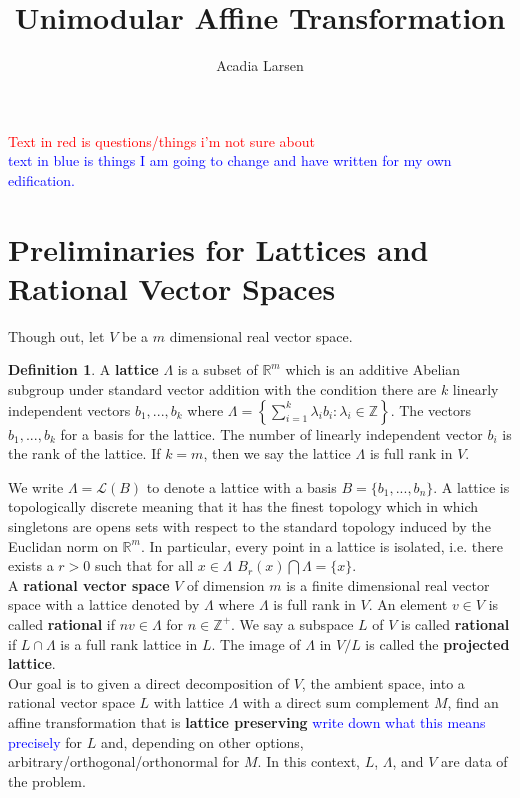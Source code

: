 \documentclass{article}
\title{Unimodular Affine Transformation}
\author{Acadia Larsen}
\newcommand{\nl}{\bigskip \\ } %
\newcommand{\Z}[0]{\mathbb{Z}}		%
\newcommand{\R}[0]{\mathbb{R}}		%
\newcommand{\La}[0]{\mathcal L}
\theoremstyle{definition}
\newtheorem{defn}[thm]{Definition}
\theoremstyle{remark}
\begin{document}
\maketitle
\textcolor{red}{Text in red is questions/things i'm not sure about}\nl 
\textcolor{blue}{text in blue is things I am going to change and have written for my own edification.}
\section{Preliminaries for Lattices and Rational Vector Spaces }
Though out, let $V$ be a $m$ dimensional real vector space. 
 \begin{defn}
 
A \textbf{lattice} $\Lambda$ is a subset of $\R^m$ which is an additive Abelian subgroup under standard vector addition with the condition there are $k$ linearly independent vectors $b_1,...,b_k$ where $\Lambda = \left\{\sum\limits_{i=1}^k \lambda_i b_i : \lambda_i \in \Z\right\}$. The vectors $b_1,...,b_k$ for a basis for the lattice. The number of linearly independent vector $b_i$ is the rank of the lattice.  If $k=m$, then we say the lattice $\Lambda$ is full rank in $V$. 
 \end{defn}
  We write $\Lambda = \La(B)$ to denote a lattice with a basis $B = \{b_1,...,b_n\}$. A lattice is topologically discrete meaning that it has the finest topology which in which singletons are opens sets with respect to the standard topology induced by the Euclidan norm on $\R^m$. In particular, every point in a lattice is isolated, i.e. there exists a $r>0$ such that for all $x\in \Lambda$ $B_r(x) \bigcap \Lambda = \{x\}$. \nl 

A \textbf{rational vector space} $V$ of dimension $m$ is a finite dimensional real vector space with a lattice denoted by $\Lambda$ where $\Lambda$ is full rank in $V$. An element $v\in V$ is called \textbf{rational} if $nv\in \Lambda$ for $n\in \Z^+$. We say a subspace $L$ of $V$ is called \textbf{rational} if $L\cap \Lambda$ is a full rank lattice in $L$. The image of $\Lambda$ in $V /L$ is called the \textbf{projected lattice}.\cite{Baldoni_2012} \nl 

Our goal is to given a direct decomposition of $V$, the ambient space, into a rational vector space $L$ with lattice $\Lambda$ with a direct sum complement $M$, find an affine transformation that is \textbf{lattice preserving} \textcolor{blue}{write down what this means precisely} for $L$ and, depending on other options, arbitrary/orthogonal/orthonormal for $M$. In this context, $L$, $\Lambda$, and $V$ are data of the problem.  \nl 
\end{document}
